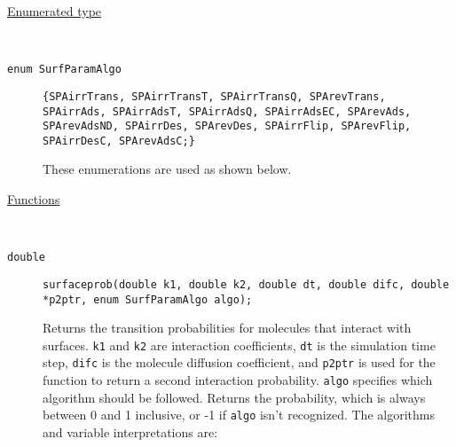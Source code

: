 \documentclass[11pt]{article}
\newcommand {\ttt} {\texttt}
\begin{document}
\begin{description}

\item[\underline{Enumerated type}]
\hfill \\

\item[\ttt{enum SurfParamAlgo}]
\ttt{\{SPAirrTrans, SPAirrTransT, SPAirrTransQ, SPArevTrans, SPAirrAds, SPAirrAdsT, SPAirrAdsQ, SPAirrAdsEC, SPArevAds, SPArevAdsND, SPAirrDes, SPArevDes, SPAirrFlip, SPArevFlip, SPAirrDesC, SPArevAdsC;\}}

These enumerations are used as shown below.

\item[\underline{Functions}]
\hfill \\

\item[\ttt{double}]
\ttt{surfaceprob(double k1, double k2, double dt, double difc, double *p2ptr, enum SurfParamAlgo algo);}

Returns the transition probabilities for molecules that interact with surfaces. \ttt{k1} and \ttt{k2} are interaction coefficients, \ttt{dt} is the simulation time step, \ttt{difc} is the molecule diffusion coefficient, and \ttt{p2ptr} is used for the function to return a second interaction probability. \ttt{algo} specifies which algorithm should be followed. Returns the probability, which is always between 0 and 1 inclusive, or -1 if \ttt{algo} isn't recognized. The algorithms and variable interpretations are:


\end{description}
\end{document}
